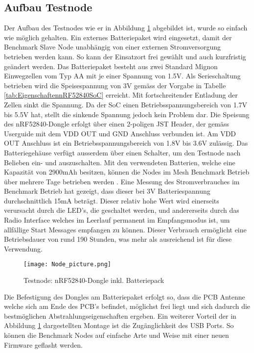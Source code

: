 \subsection{Aufbau Testnode}\label{subsec:AufbauTestnode}
Der Aufbau des Testnodes wie er in Abbildung \ref{fig:TestnodenRF52840-DongleinklBatteriepack} abgebildet ist, wurde so einfach wie möglich gehalten.
Ein externes Batteriepaket wird eingesetzt, damit der Benchmark Slave Node unabhängig von einer externen Stromversorgung betrieben werden kann.
So kann der Einsatzort frei gewählt und auch kurzfristig geändert werden.
Das Batteriepaket besteht aus zwei Standard Mignon Einwegzellen vom Typ AA mit je einer Spannung von 1.5V. Als Serieschaltung betrieben wird die Speisespannung von 3V gemäss der Vorgabe in Tabelle \ref{tab:EigenschaftennRF52840SoC} erreicht. Mit fortschreitender Entladung der Zellen sinkt die Spannung. Da der SoC einen Betriebsspannungsbereich von 1.7V bis 5.5V hat, stellt die sinkende Spannung jedoch kein Problem dar.
Die Speisung des nRF52840-Dongle erfolgt über einen 2-poligen JST Header, der gemäss Userguide \cite{nordic_semiconductor_asa_nrf52840_dongle_user_guide_v11pdf_2019} mit dem VDD OUT und GND Anschluss verbunden ist. Am VDD OUT Anschluss ist ein Betriebsspannungsbereich von 1.8V bis 3.6V zulässig.
Das Batteriegehäuse verfügt ausserdem über einen Schalter, um den Testnode nach Belieben ein- und auszuschalten.
Mit den verwendeten Batterien, welche eine Kapazität von 2900mAh besitzen, können die Nodes im Mesh Benchmark Betrieb über mehrere Tage betrieben werden \cite{distrelec_schweiz_ag_rnd_2020}.
Eine Messung des Stromverbrauches im Benchmark Betrieb hat gezeigt, dass dieser bei 3V Batteriespannung durchschnittlich 15mA beträgt. Dieser relativ hohe Wert wird einerseits verursacht durch die LED's, die geschaltet werden, und andererseits durch das Radio Interface welches im Leerlauf permanent im Empfangsmodus ist, um allfällige Start Messages empfangen zu können. 
Dieser Verbrauch ermöglicht eine Betriebsdauer von rund 190 Stunden, was mehr als ausreichend ist für diese Verwendung.

\begin{figure} [H]
	\centering
	\texttt{[image: Node\_picture.png]}
	\caption{Testnode: nRF52840-Dongle inkl. Batteriepack}
	\label{fig:TestnodenRF52840-DongleinklBatteriepack}
\end{figure}

Die Befestigung des Dongles am Batteriepaket erfolgt so, dass die PCB Antenne welche sich am Ende des PCB's befindet, möglichst frei liegt und sich dadurch die bestmöglichen Abstrahlungseigenschaften ergeben. Ein weiterer Vorteil der in Abbildung \ref{fig:TestnodenRF52840-DongleinklBatteriepack} dargestellten Montage ist die Zugänglichkeit des USB Ports. So können die Benchmark Nodes auf einfache Arte und Weise mit einer neuen Firmware geflasht werden.

